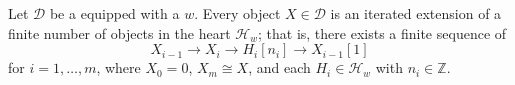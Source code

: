 \begin{proposition} \label{proposition:objects_of_triangulated_category_with_bounded_weight_structure__is_an_interated_extension_of_finitely_many_objects_in_heart}
Let $\mathcal{D}$ be a  equipped with a   $w$. 
Every object $X \in \mathcal{D}$ is an iterated extension of a finite number of objects in the heart $\mathcal{H}_w$; that is, there exists a finite sequence of  
\[
X_{i-1} \to X_i \to H_i[n_i] \to X_{i-1}[1]
\]
for $i=1, \dots, m$, where $X_0 = 0$, $X_m \cong X$, and each $H_i \in \mathcal{H}_w$ with $n_i \in \mathbb{Z}$.
\end{proposition}